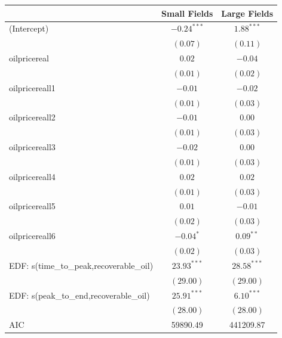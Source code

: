 \documentclass[11pt]{article}
\begin{document}
\begin{spacing}{1}
\begin{table}
\begin{center}
\begin{tabular}{l c c }
\hline
                                     & Small Fields & Large Fields \\
\hline
(Intercept)                          & $-0.24^{***}$ & $1.88^{***}$  \\
                                     & $(0.07)$      & $(0.11)$      \\
oilpricereal                       & $0.02$        & $-0.04$       \\
                                     & $(0.01)$      & $(0.02)$      \\
oilpricereall1                    & $-0.01$       & $-0.02$       \\
                                     & $(0.01)$      & $(0.03)$      \\
oilpricereall2                    & $-0.01$       & $0.00$        \\
                                     & $(0.01)$      & $(0.03)$      \\
oilpricereall3                    & $-0.02$       & $0.00$        \\
                                     & $(0.01)$      & $(0.03)$      \\
oilpricereall4                    & $0.02$        & $0.02$        \\
                                     & $(0.01)$      & $(0.03)$      \\
oilpricereall5                    & $0.01$        & $-0.01$       \\
                                     & $(0.02)$      & $(0.03)$      \\
oilpricereall6                    & $-0.04^{*}$   & $0.09^{**}$   \\
                                     & $(0.02)$      & $(0.03)$      \\
EDF: s(time_to_peak,recoverable_oil) & $23.93^{***}$ & $28.58^{***}$ \\
                                     & $(29.00)$     & $(29.00)$     \\
EDF: s(peak_to_end,recoverable_oil)  & $25.91^{***}$ & $6.10^{***}$  \\
                                     & $(28.00)$     & $(28.00)$     \\
\hline
AIC                                  & 59890.49      & 441209.87     \\

\end{tabular}
\end{center}
\end{table}
\end{spacing}
\end{document}
